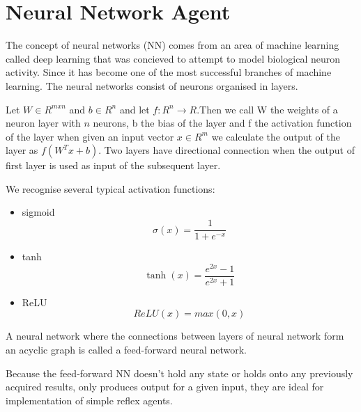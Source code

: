 \section{Neural Network Agent}
The concept of neural networks (NN) comes from an area of machine learning called deep learning that was concieved to attempt to model biological neuron activity. Since it has become one of the most successful branches of machine learning. \citep{russell2021}  
The neural networks consist of neurons organised in layers.
\begin{defn}
Let $ W \in R^{m x n} $ and $ b\in R^{n}$ and let $ f:R^{n} \rightarrow R$.Then we call W the weights of a neuron layer with $ n $ neurons, b the bias of the layer and f the activation function of the layer when given an input vector $ x \in R^{m} $ we calculate the output of the layer as $ f(W^{T}x+b)$. Two layers have directional connection when the output of first layer is used as input of the subsequent layer.
\end{defn}
We recognise several typical activation functions:
\begin{itemize}
\item sigmoid
$$ \sigma (x) = \frac{1}{1+e^{-x}} $$
\item tanh
$$ \tanh(x) = \frac{e^{2x}-1}{e^{2x}+1} $$
\item ReLU
$$ ReLU (x) = max(0,x) $$
\end{itemize}
\begin{defn}\citep{russell2021}  
A neural network where the connections between layers of neural network form an acyclic graph is called a feed-forward neural network.
\end{defn}
Because the feed-forward NN doesn't hold any state or holds onto any previously acquired results, only produces output for a given input, they are ideal for implementation of simple reflex agents.









